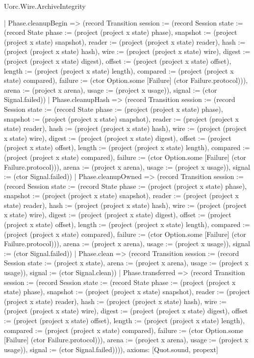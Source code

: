 \begin{lexlean}{Uorc.Wire.ArchiveIntegrity}
\begin{semanticmodule}
{      | Phase.cleanupBegin => (record Transition {session := (record Session {state := (record State {phase := (project (project x state) phase), snapshot := (project (project x state) snapshot), reader := (project (project x state) reader), hash := (project (project x state) hash), wire := (project (project x state) wire), digest := (project (project x state) digest), offset := (project (project x state) offset), length := (project (project x state) length), compared := (project (project x state) compared), failure := (ctor Option.some [Failure] (ctor Failure.protocol))}), arena := (project x arena), usage := (project x usage)}), signal := (ctor Signal.failed)})
      | Phase.cleanupHash => (record Transition {session := (record Session {state := (record State {phase := (project (project x state) phase), snapshot := (project (project x state) snapshot), reader := (project (project x state) reader), hash := (project (project x state) hash), wire := (project (project x state) wire), digest := (project (project x state) digest), offset := (project (project x state) offset), length := (project (project x state) length), compared := (project (project x state) compared), failure := (ctor Option.some [Failure] (ctor Failure.protocol))}), arena := (project x arena), usage := (project x usage)}), signal := (ctor Signal.failed)})
      | Phase.cleanupOwned => (record Transition {session := (record Session {state := (record State {phase := (project (project x state) phase), snapshot := (project (project x state) snapshot), reader := (project (project x state) reader), hash := (project (project x state) hash), wire := (project (project x state) wire), digest := (project (project x state) digest), offset := (project (project x state) offset), length := (project (project x state) length), compared := (project (project x state) compared), failure := (ctor Option.some [Failure] (ctor Failure.protocol))}), arena := (project x arena), usage := (project x usage)}), signal := (ctor Signal.failed)})
      | Phase.clean => (record Transition {session := (record Session {state := (project x state), arena := (project x arena), usage := (project x usage)}), signal := (ctor Signal.clean)})
      | Phase.transferred => (record Transition {session := (record Session {state := (record State {phase := (project (project x state) phase), snapshot := (project (project x state) snapshot), reader := (project (project x state) reader), hash := (project (project x state) hash), wire := (project (project x state) wire), digest := (project (project x state) digest), offset := (project (project x state) offset), length := (project (project x state) length), compared := (project (project x state) compared), failure := (ctor Option.some [Failure] (ctor Failure.protocol))}), arena := (project x arena), usage := (project x usage)}), signal := (ctor Signal.failed)}))),
  axioms: [Quot.sound, propext]
}


\end{semanticmodule}
\end{lexlean}
